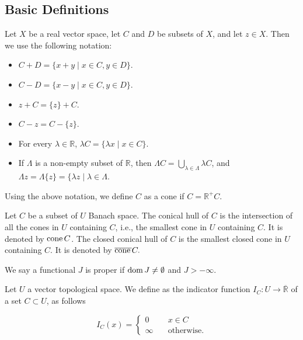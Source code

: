 


\subsection{Basic Definitions}


Let $X$ be a real  vector space, let $C$ and $D$ be subsets of $X$, and let $z \in X$. Then we use the following notation:
\begin{itemize}
	\item $C + D =\lbrace x + y \mid x \in C, y \in D\rbrace$.
	\item $C -D =\lbrace x - y \mid x \in C, y \in D\rbrace$.
	\item $z+C=\lbrace z \rbrace +C$.
	\item  $C-z=C-\lbrace z \rbrace$. 
	\item For every $\lambda \in \mathbb{R}$, $\lambda C =\lbrace\lambda x \mid x \in C\rbrace$.
	\item  If $\Lambda$ is a non-empty subset of $\mathbb{R}$, then $\Lambda C = \bigcup_{\lambda \in \Lambda}\lambda C$, and $\Lambda z = \Lambda \lbrace z \rbrace =\lbrace\lambda z \mid \lambda \in \Lambda$.
\end{itemize}
 

\begin{definition}[Cone]
	Using the above notation, we define $C$ as a cone if $C=\mathbb{R}^+C$.
\end{definition}

\begin{definition}
	Let $C$ be a subset of $U$ Banach space. The conical hull of $C$ is the intersection of all the cones in $U$ containing $C$, i.e., the smallest cone in $U$ containing $C$. It is denoted by $\mathrm{cone\,} C$. The closed conical hull of $C$ is the smallest closed cone in $U$ containing $C$. It is denoted by $\overline{\mathrm{cone\,}} C.$
\end{definition}

\begin{definition}
	We say a functional $J$ is proper if $\mathrm{dom\,} J \neq \emptyset$ and $J>-\infty$.
\end{definition}

\begin{definition}
	Let $U$ a vector topological space. We define as the indicator function $I_C:U\rightarrow \overline{\mathbb{R}}$ of a set $C \subset U$, as follows
	
	\begin{equation*}
		I_C(x)=\left\lbrace
		\begin{array}{ll}
		0	&\quad x \in C \\
		\infty &\quad \text{otherwise.}
		\end{array}
		\right.
	\end{equation*}
	
\end{definition}

